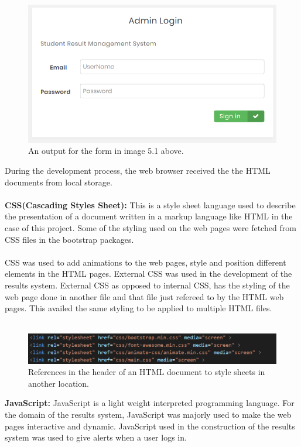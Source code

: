 \begin{figure}[H]
\includegraphics[scale=0.8]{images/form_output.png}
\caption{An output for the form in image 5.1 above.}
\end{figure}
During the development process, the web browser received the the HTML documents from local storage.\\~\\
\textbf{CSS(Cascading Styles Sheet): }This is a style sheet language used to describe the presentation of a document written in a markup language like HTML in the case of this project. Some of the styling used on the web pages were fetched from CSS files in the bootstrap packages. \\\\
CSS was used to add animations to the web pages, style and position different elements in the HTML pages. External CSS was used in the development of the results system. External CSS as opposed to internal CSS, has the styling of the web page done in another file and that file just refereed to by the HTML web pages. This availed the same styling to be applied to multiple HTML files.\\~\\
\begin{figure}[H]
\includegraphics[scale=0.7]{images/css_references.png}
\caption{References in the header of an HTML document to style sheets in another location.}
\end{figure}
\textbf{JavaScript: }JavaScript is a light weight interpreted programming language. For the domain of the results system, JavaScript was majorly used to make the web pages interactive and dynamic. JavaScript used in the construction of the results system was used to give alerts when a user logs in.\\~\\
